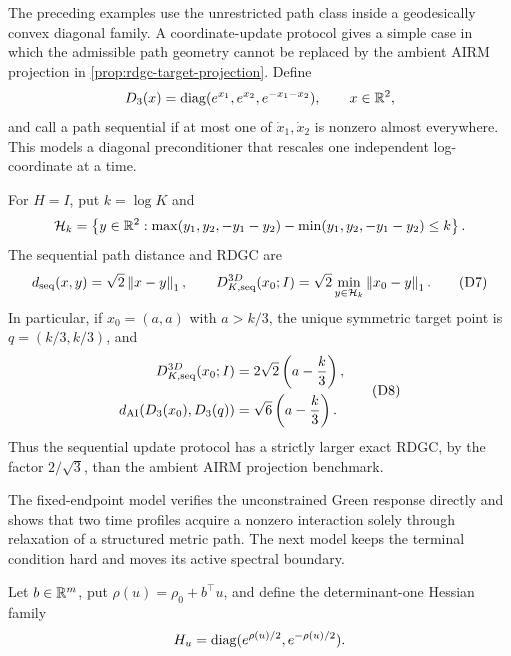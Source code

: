 The preceding examples use the unrestricted path class inside a geodesically
convex diagonal family.  A coordinate-update protocol gives a simple case in
which the admissible path geometry cannot be replaced by the ambient AIRM
projection in \cref{prop:rdgc-target-projection}.  Define
\[
  D_3(x)=\operatorname{diag}(e^{x_1},e^{x_2},e^{-x_1-x_2}),
  \qquad x\in\mathbb R^2,
\]
and call a path sequential if at most one of \(\dot x_1,\dot x_2\) is nonzero
almost everywhere.  This models a diagonal preconditioner that rescales one
independent log-coordinate at a time.

\begin{proposition}
\label{prop:sequential-diagonal-rdgc}
For \(H=I\), put \(k=\log K\) and
\[
  \mathcal H_k
  =\left\{y\in\mathbb R^2:
  \max(y_1,y_2,-y_1-y_2)-
  \min(y_1,y_2,-y_1-y_2)\le k\right\}.
\]
The sequential path distance and RDGC are
\begin{equation}
  d_{\rm seq}(x,y)=\sqrt2\left\lVert x-y\right\rVert_1,
  \qquad
  D_{K,{\rm seq}}^{3D}(x_0;I)
  =\sqrt2\min_{y\in\mathcal H_k}\left\lVert x_0-y\right\rVert_1.
  \tag{D7}
\end{equation}
In particular, if \(x_0=(a,a)\) with \(a>k/3\), the unique symmetric target
point is \(q=(k/3,k/3)\), and
\begin{equation}
\begin{aligned}
  D_{K,{\rm seq}}^{3D}(x_0;I)
  &=2\sqrt2\left(a-\frac{k}{3}\right),\\
  d_{\mathrm{AI}}(D_3(x_0),D_3(q))
  &=\sqrt6\left(a-\frac{k}{3}\right).
\end{aligned}
\tag{D8}
\end{equation}
Thus the sequential update protocol has a strictly larger exact RDGC, by the
factor \(2/\sqrt3\), than the ambient AIRM projection benchmark.
\end{proposition}

The fixed-endpoint model verifies the unconstrained Green response directly
and shows that two time profiles acquire a nonzero interaction solely through
relaxation of a structured metric path.  The next model keeps the terminal
condition hard and moves its active spectral boundary.

Let \(b\in\mathbb R^m\), put \(\rho(u)=\rho_0+b^\top u\), and define the
determinant-one Hessian family
\[
  H_u=\operatorname{diag}(e^{\rho(u)/2},e^{-\rho(u)/2}).
\]

